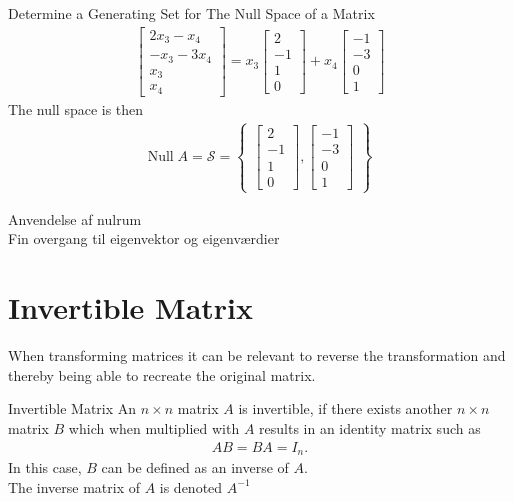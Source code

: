 \begin{example}{Determine a Generating Set for The Null Space of a Matrix }
\begin{align*}
\begin{bmatrix}
   2x_3 - x_4 \\ -x_3 -3x_4 \\ x_3 \\ x_4
\end{bmatrix} = x_3
\begin{bmatrix}
   2\\ -1\\ 1 \\0
\end{bmatrix} + x_4
\begin{bmatrix}
   -1\\ -3\\ 0\\ 1
\end{bmatrix}
\end{align*}
The null space is then
\begin{align*}
\text{Null}\; A = \mathcal{S} = 
\begin{Bmatrix}
\begin{bmatrix}
   2\\ -1\\ 1 \\0
\end{bmatrix},
\begin{bmatrix}
   -1\\ -3\\ 0\\ 1
\end{bmatrix}
\end{Bmatrix}
\end{align*}
\end{example}

Anvendelse af nulrum\\
Fin overgang til eigenvektor og eigenværdier

\section{Invertible Matrix}
When transforming matrices it can be relevant to reverse the transformation and thereby being able to recreate the original matrix. 

\begin{definition}{Invertible Matrix}
    An  $n \times n$ matrix $A$ is invertible, if there exists another $n \times n$ matrix $B$ which when multiplied with $A$ results in an identity matrix such as
    \begin{align*}
        AB=BA=I_n.
    \end{align*}
    In this case, $B$ can be defined as an inverse of $A$. \\
    The inverse matrix of $A$ is denoted $A^{-1}$
\end{definition}

